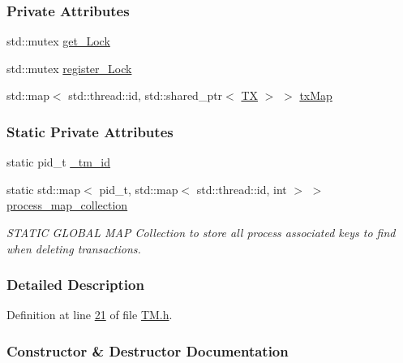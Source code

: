 \subsubsection*{Private Attributes}
\begin{DoxyCompactItemize}
\item 
std\+::mutex \hyperlink{class_t_m_a123bc5aa0766a7b909bebc54a429e5b0_a123bc5aa0766a7b909bebc54a429e5b0}{get\+\_\+\+Lock}
\item 
std\+::mutex \hyperlink{class_t_m_aeb26546681bfe64e21606b8c012bb8c3_aeb26546681bfe64e21606b8c012bb8c3}{register\+\_\+\+Lock}
\item 
std\+::map$<$ std\+::thread\+::id, std\+::shared\+\_\+ptr$<$ \hyperlink{class_t_x}{TX} $>$ $>$ \hyperlink{class_t_m_a0333dfa193ea99d7626de74a2b932e9b_a0333dfa193ea99d7626de74a2b932e9b}{tx\+Map}
\end{DoxyCompactItemize}
\subsubsection*{Static Private Attributes}
\begin{DoxyCompactItemize}
\item 
static pid\+\_\+t \hyperlink{class_t_m_a6fb90615393f9205838e302c714bbd60_a6fb90615393f9205838e302c714bbd60}{\+\_\+tm\+\_\+id}
\item 
static std\+::map$<$ pid\+\_\+t, std\+::map$<$ std\+::thread\+::id, int $>$ $>$ \hyperlink{class_t_m_a81c3bd28ad2343a620fa070f8ac186ca_a81c3bd28ad2343a620fa070f8ac186ca}{process\+\_\+map\+\_\+collection}
\begin{DoxyCompactList}\small\item\em S\+T\+A\+T\+IC G\+L\+O\+B\+AL M\+AP Collection to store all process associated keys to find when deleting transactions. \end{DoxyCompactList}\end{DoxyCompactItemize}


\subsubsection{Detailed Description}


Definition at line \hyperlink{_t_m_8h_source_l00021}{21} of file \hyperlink{_t_m_8h_source}{T\+M.\+h}.



\subsubsection{Constructor \& Destructor Documentation}
